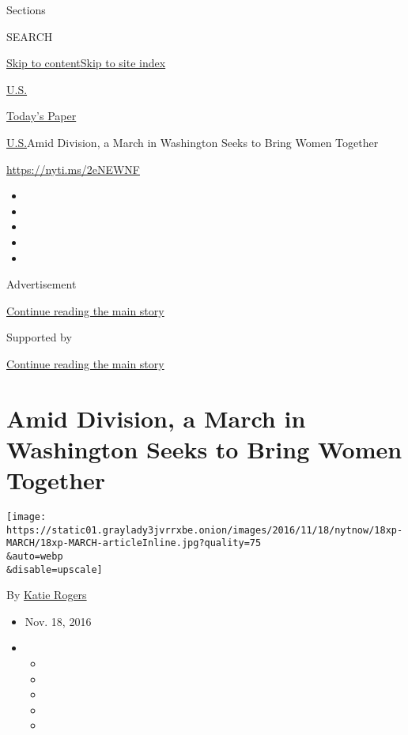 Sections

SEARCH

\protect\hyperlink{site-content}{Skip to
content}\protect\hyperlink{site-index}{Skip to site index}

\href{https://www.nytimes3xbfgragh.onion/section/us}{U.S.}

\href{https://myaccount.nytimes3xbfgragh.onion/auth/login?response_type=cookie\&client_id=vi}{}

\href{https://www.nytimes3xbfgragh.onion/section/todayspaper}{Today's
Paper}

\href{/section/us}{U.S.}\textbar{}Amid Division, a March in Washington
Seeks to Bring Women Together

\url{https://nyti.ms/2eNEWNF}

\begin{itemize}
\item
\item
\item
\item
\item
\end{itemize}

Advertisement

\protect\hyperlink{after-top}{Continue reading the main story}

Supported by

\protect\hyperlink{after-sponsor}{Continue reading the main story}

\hypertarget{amid-division-a-march-in-washington-seeks-to-bring-women-together}{%
\section{Amid Division, a March in Washington Seeks to Bring Women
Together}\label{amid-division-a-march-in-washington-seeks-to-bring-women-together}}

\texttt{[image: https://static01.graylady3jvrrxbe.onion/images/2016/11/18/nytnow/18xp-MARCH/18xp-MARCH-articleInline.jpg?quality=75\\\&auto=webp\\\&disable=upscale]}

By \href{http://www.nytimes3xbfgragh.onion/by/katie-rogers}{Katie
Rogers}

\begin{itemize}
\item
  Nov. 18, 2016
\item
  \begin{itemize}
  \item
  \item
  \item
  \item
  \item
  \end{itemize}
\end{itemize}

